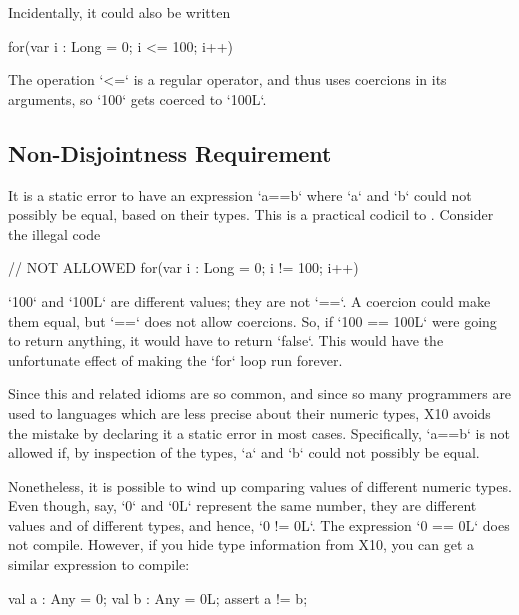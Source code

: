 Incidentally, it could also be written 
\begin{xten}
for(var i : Long = 0; i <= 100; i++) 
\end{xten}
The operation \xcd`<=` is a regular operator, and thus uses coercions in its
arguments, so \xcd`100` gets coerced to \xcd`100L`.  

\subsection{Non-Disjointness Requirement}

It is a static error to have an expression \xcd`a==b` where \xcd`a` and
\xcd`b` could not possibly be equal, based on their types.  This is a
practical codicil to .  Consider the illegal code 
\begin{xten}
// NOT ALLOWED
for(var i : Long = 0; i != 100; i++) 
\end{xten}

\xcd`100` and \xcd`100L` are different values; they are not \xcd`==`. A
coercion could make them equal, but \xcd`==` does not allow coercions. So, if
\xcd`100 == 100L` were going to return anything, it would have to return
\xcd`false`. This would have the unfortunate effect of making the \xcd`for`
loop run forever.

Since this and related idioms are so common, and since so many programmers are
used to languages which are less precise about their numeric types, X10 avoids
the mistake by declaring it a static error in most cases.  Specifically,
\xcd`a==b` is not allowed if, by inspection of the types, \xcd`a` and \xcd`b`
could not possibly be equal.

\begin{ex}
Nonetheless, it is possible to wind up comparing values of different numeric
types.   Even though, say, \xcd`0` and \xcd`0L` represent the same number,
they are different values and of different types, and hence, \xcd`0 != 0L`.  
The expression \xcd`0 == 0L` does not compile.  However, if you hide type
information from X10, you can get a similar expression to compile: 

\begin{xten}
   val a : Any = 0;
   val b : Any = 0L;
   assert a != b;
\end{xten}


\end{ex}


